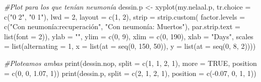 \documentclass[
]{article}
\newenvironment{Shaded}{\begin{snugshade}}{\end{snugshade}}
\newcommand{\AttributeTok}[1]{\textcolor[rgb]{0.77,0.63,0.00}{#1}}
\newcommand{\CommentTok}[1]{\textcolor[rgb]{0.56,0.35,0.01}{\textit{#1}}}
\newcommand{\ConstantTok}[1]{\textcolor[rgb]{0.00,0.00,0.00}{#1}}
\newcommand{\DecValTok}[1]{\textcolor[rgb]{0.00,0.00,0.81}{#1}}
\newcommand{\FloatTok}[1]{\textcolor[rgb]{0.00,0.00,0.81}{#1}}
\newcommand{\FunctionTok}[1]{\textcolor[rgb]{0.00,0.00,0.00}{#1}}
\newcommand{\NormalTok}[1]{#1}
\newcommand{\OtherTok}[1]{\textcolor[rgb]{0.56,0.35,0.01}{#1}}
\newcommand{\SpecialCharTok}[1]{\textcolor[rgb]{0.00,0.00,0.00}{#1}}
\newcommand{\StringTok}[1]{\textcolor[rgb]{0.31,0.60,0.02}{#1}}
\begin{document}
\begin{Shaded}
\begin{Highlighting}[]
\CommentTok{\#Plot para los que tenían neumonía}
\NormalTok{dessin.p }\OtherTok{\textless{}{-}} \FunctionTok{xyplot}\NormalTok{(my.nelaal.p, }\AttributeTok{tr.choice =} \FunctionTok{c}\NormalTok{(}\StringTok{"0 2"}\NormalTok{, }\StringTok{"0 1"}\NormalTok{), }\AttributeTok{lwd =} \DecValTok{2}\NormalTok{, }\AttributeTok{layout =} \FunctionTok{c}\NormalTok{(}\DecValTok{1}\NormalTok{, }\DecValTok{2}\NormalTok{), }\AttributeTok{strip =} \FunctionTok{strip.custom}\NormalTok{( }\AttributeTok{factor.levels =} \FunctionTok{c}\NormalTok{(}\StringTok{"Con neumonía:recuperación"}\NormalTok{, }\StringTok{"Con neumonía: Muertos"}\NormalTok{), }\AttributeTok{par.strip.text =} \FunctionTok{list}\NormalTok{(}\AttributeTok{font =} \DecValTok{2}\NormalTok{)), }\AttributeTok{ylab =} \StringTok{""}\NormalTok{, }\AttributeTok{ylim =} \FunctionTok{c}\NormalTok{(}\DecValTok{0}\NormalTok{, }\DecValTok{9}\NormalTok{), }\AttributeTok{xlim =} \FunctionTok{c}\NormalTok{(}\DecValTok{0}\NormalTok{, }\DecValTok{190}\NormalTok{), }\AttributeTok{xlab =} \StringTok{"Days"}\NormalTok{, }\AttributeTok{scales =} \FunctionTok{list}\NormalTok{(}\AttributeTok{alternating =} \DecValTok{1}\NormalTok{, }\AttributeTok{x =} \FunctionTok{list}\NormalTok{(}\AttributeTok{at =} \FunctionTok{seq}\NormalTok{(}\DecValTok{0}\NormalTok{, }\DecValTok{150}\NormalTok{, }\DecValTok{50}\NormalTok{)), }\AttributeTok{y =} \FunctionTok{list}\NormalTok{(}\AttributeTok{at =} \FunctionTok{seq}\NormalTok{(}\DecValTok{0}\NormalTok{, }\DecValTok{8}\NormalTok{, }\DecValTok{2}\NormalTok{))))}
\end{Highlighting}
\end{Shaded}

\begin{Shaded}
\begin{Highlighting}[]
\CommentTok{\#Ploteamos ambas}
\FunctionTok{print}\NormalTok{(dessin.nop, }\AttributeTok{split =} \FunctionTok{c}\NormalTok{(}\DecValTok{1}\NormalTok{, }\DecValTok{1}\NormalTok{, }\DecValTok{2}\NormalTok{, }\DecValTok{1}\NormalTok{), }\AttributeTok{more =} \ConstantTok{TRUE}\NormalTok{, }\AttributeTok{position =} \FunctionTok{c}\NormalTok{(}\DecValTok{0}\NormalTok{, }\DecValTok{0}\NormalTok{, }\FloatTok{1.07}\NormalTok{, }\DecValTok{1}\NormalTok{)) }
\FunctionTok{print}\NormalTok{(dessin.p, }\AttributeTok{split =} \FunctionTok{c}\NormalTok{(}\DecValTok{2}\NormalTok{, }\DecValTok{1}\NormalTok{, }\DecValTok{2}\NormalTok{, }\DecValTok{1}\NormalTok{), }\AttributeTok{position =} \FunctionTok{c}\NormalTok{(}\SpecialCharTok{{-}}\FloatTok{0.07}\NormalTok{, }\DecValTok{0}\NormalTok{, }\DecValTok{1}\NormalTok{, }\DecValTok{1}\NormalTok{))}
\end{Highlighting}
\end{Shaded}
\end{document}
